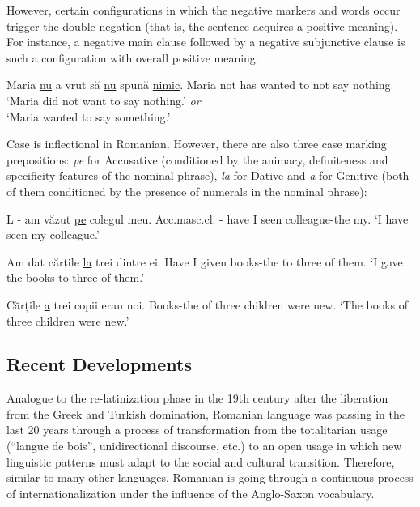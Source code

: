 \documentclass[]{../../metanetpaper}
\begin{document}
\begin{multicols}{2}
However, certain configurations in which the negative markers and words occur trigger the double negation (that is, the sentence acquires a positive meaning). For instance, a negative main clause followed by a negative subjunctive clause is such a configuration with overall positive meaning:

\begin{example}
\gll Maria \underline{nu} a vrut să \underline{nu} spună \underline{nimic}.
Maria not has wanted to not say nothing.
\glt `Maria did not want to say nothing.'  \textit{or}\\ `Maria wanted to say something.'
\glend
\end{example}

Case is inflectional in Romanian. However, there are also three case marking prepositions: \textit{pe} for Accusative (conditioned by the animacy, definiteness and specificity features of the nominal phrase), \textit{la} for Dative and \textit{a} for Genitive (both of them conditioned by the presence of numerals in the nominal phrase):

\begin{example}
\gll L - am văzut \underline{pe} colegul meu.
Acc.masc.cl. - {have I} seen {} {colleague-the my}.
\glt `I have seen my colleague.'
\glend
\end{example}

\begin{example}
\gll Am dat cărțile \underline{la} trei dintre ei.
{Have I} given books-the to three of them.
\glt `I gave the books to three of them.'
\glend
\end{example}

\begin{example}
\gll Cărțile \underline{a} trei copii erau noi.
Books-the of three children were new.
\glt `The books of three children were new.'
\glend
\end{example}


\subsection{Recent Developments}

Analogue to the re-latinization phase in the 19th century after the liberation from the Greek and Turkish domination, Romanian language was passing in the last 20 years through a process of transformation from the totalitarian usage (“langue de bois”, unidirectional discourse, etc.) to an open usage in which new linguistic patterns must adapt to the social and cultural transition. Therefore, similar to many other languages, Romanian is going through a continuous process of internationalization under the influence of the Anglo-Saxon vocabulary. 


\end{multicols}
\end{document}

